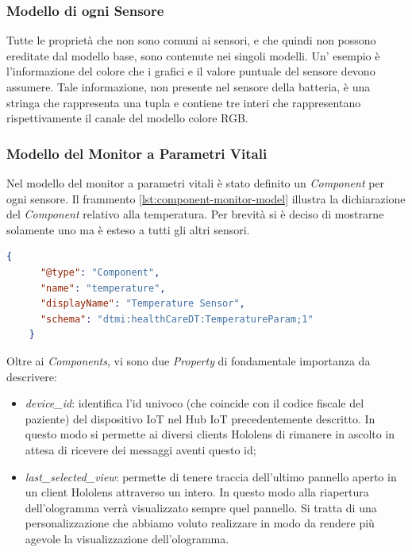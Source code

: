 \subsubsection{Modello di ogni Sensore}
Tutte le proprietà che non sono comuni ai sensori, e che quindi non possono ereditate dal modello base, sono contenute nei singoli modelli. Un' esempio è l'informazione del colore che i grafici e il valore puntuale del sensore devono assumere. Tale informazione, non presente nel sensore della batteria, è una stringa che rappresenta una tupla e contiene tre interi che rappresentano rispettivamente il canale del modello colore RGB.

\subsubsection{Modello del Monitor a Parametri Vitali}

Nel modello del monitor a parametri vitali è stato definito un \textit{Component} per ogni sensore. Il frammento \ref{lst:component-monitor-model} illustra la dichiarazione del \textit{Component} relativo alla temperatura. Per brevità si è deciso di mostrarne solamente uno ma è esteso a tutti gli altri sensori.
\begin{lstlisting}[label={lst:component-monitor-model}, caption={Componente temperature del modello del monitor.}, language=json, firstnumber=1]
    {
      "@type": "Component",
      "name": "temperature",
      "displayName": "Temperature Sensor",
      "schema": "dtmi:healthCareDT:TemperatureParam;1"
    }
\end{lstlisting}

Oltre ai \textit{Components}, vi sono due \textit{Property} di fondamentale importanza da descrivere:

\begin{itemize}
    \item \textit{device\_id}: identifica l'id univoco (che coincide con il codice fiscale del paziente) del dispositivo IoT nel Hub IoT precedentemente descritto. In questo modo si permette ai diversi clients Hololens di rimanere in ascolto in attesa di ricevere dei messaggi aventi questo id;
    
    \item \textit{last\_selected\_view}: permette di tenere traccia dell'ultimo pannello aperto in un client Hololens attraverso un intero. In questo modo alla riapertura dell'ologramma verrà visualizzato sempre quel pannello. Si tratta di una personalizzazione che abbiamo voluto realizzare in modo da rendere più agevole la visualizzazione dell'ologramma.
\end{itemize}

